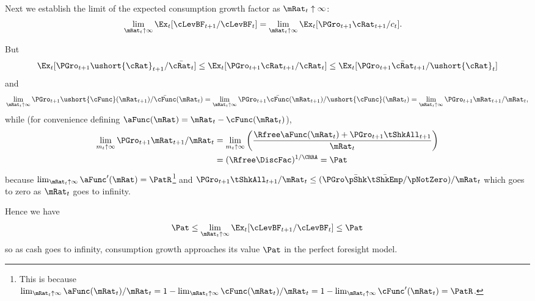 \documentclass[BufferStockTheory]{subfiles}
\begin{document}
\renewcommand{\figFile}{cFuncBounds}
\hypertarget{\figFile}{}



Next we establish the limit of the expected consumption growth factor
as $\mRat_{t} \uparrow \infty$:
\begin{align*}
  \lim_{\mRat_{t} \uparrow \infty} \Ex_{t}[
  \cLevBF_{t+1}/\cLevBF_{t}]  & = \lim_{\mRat_{t} \uparrow \infty} \Ex_{t}[
                                {\PGro}_{t+1} {\cRat}_{t+1}/c_{t}]. 
\end{align*}

But
\begin{align*}
  \Ex_{t}[{\PGro}_{t+1} {\ushort{\cRat}}_{t+1}/\bar{\cRat_{t}}] \leq \Ex_{t}[{\PGro}_{t+1} {\cRat}_{t+1}/\cRat_{t}] \leq \Ex_{t}[{\PGro}_{t+1} {\bar{\cRat}}_{t+1}/\ushort{\cRat}_{t}]
\end{align*}
and
\begin{equation*}  \label{eq:xttoinfty}
  \lim_{\mRat_t \uparrow \infty} \PGro_{t+1}\ushort{\cFunc}(\mRat_{t+1})/\bar{\cFunc}(\mRat_t) =
  \lim_{\mRat_{t} \uparrow \infty} \PGro_{t+1}\bar{\cFunc}(\mRat_{t+1})/\ushort{\cFunc}(\mRat_t) =
  \lim_{\mRat_{t} \uparrow \infty}\PGro_{t+1} \mRat_{t+1}/\mRat_t,  
\end{equation*}
while (for convenience defining $\aFunc(\mRat)=\mRat_{t}-\cFunc(\mRat_{t})$), \hypertarget{xtp1toinfty}{}
\begin{align}  \label{eq:xtp1toinfty}
  \lim_{m_{t} \uparrow \infty} \PGro_{t+1} \mRat_{t+1}/\mRat_t  & = \lim_{m_{t} \uparrow \infty}
                                                                  \left(\frac{\Rfree \aFunc(\mRat_t)+{\PGro}_{t+1}\tShkAll_{t+1}}{\mRat_t}\right)
  \\  & = (\Rfree \DiscFac)^{1/\CRRA} = \Pat \notag
\end{align}
because $\lim_{\mRat_{t}\uparrow \infty} \aFunc^{\prime}(\mRat)=\PatR$\footnote{This is because $\lim_{\mRat_{t}\uparrow \infty} \aFunc(\mRat_{t})/\mRat_{t}=1-\lim_{\mRat_{t}\uparrow \infty} \cFunc(\mRat_{t})/\mRat_{t}=1-\lim_{\mRat_{t}\uparrow \infty}\cFunc^{\prime}(\mRat_{t})=\PatR$.} and
$\PGro_{t+1}\tShkAll_{t+1}/\mRat_{t} \leq (\PGro \bar{\pShk} \bar{\tShkEmp}/\pNotZero )/\mRat_{t}$ which
goes to zero as $\mRat_{t}$ goes to infinity.

Hence we have
\begin{equation*}
  {\Pat}  \leq \lim_{\mRat_{t} \uparrow \infty} \Ex_{t}[\cLevBF_{t+1}/\cLevBF_{t}] \leq {\Pat} 
\end{equation*}
so as cash goes to infinity, consumption growth approaches its
value $\Pat$ in the perfect foresight model.
\end{document}
